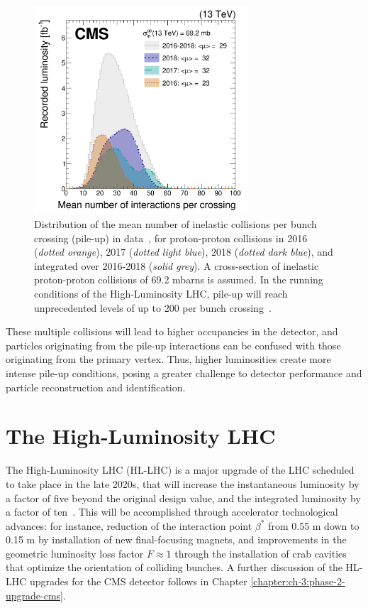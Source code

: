 \begin{figure}[ht]
    \centering
    \includegraphics[width=8cm]{figures/ch-2-cern-cms/pileup-run-2-CMS-JME-18-001_Figure_001.png}
    \caption[Distribution of the mean number of inelastic collisions per bunch crossing (pile-up) in data, for proton-proton collisions in 2016-2018]{Distribution of the mean number of inelastic collisions per bunch crossing (pile-up) in data~\cite{CMS-JME-18-001}, for proton-proton collisions in 2016 (\textit{dotted orange}), 2017 (\textit{dotted light blue}), 2018 (\textit{dotted dark blue}), and integrated over 2016-2018 (\textit{solid grey}). A cross-section of inelastic proton-proton collisions of 69.2 mbarns is assumed. In the running conditions of the High-Luminosity LHC, pile-up will reach unprecedented levels of up to 200 per bunch crossing~\cite{CERN-2020-010-HL-LHC-TDR}.}
    \label{fig:pileup-run-2}
\end{figure}

These multiple collisions will lead to higher occupancies in the detector, and particles originating from the pile-up interactions can be confused with those originating from the primary vertex. Thus, higher luminosities create more intense pile-up conditions, posing a greater challenge to detector performance and particle reconstruction and identification.


\section{The High-Luminosity LHC}
\label{section:HL-LHC}
The High-Luminosity LHC (HL-LHC) is a major upgrade of the LHC scheduled to take place in the late 2020s, that will increase the instantaneous luminosity by a factor of five beyond the original design value, and the integrated luminosity by a factor of ten~\cite{CERN-2020-010-HL-LHC-TDR}. This will be accomplished through accelerator technological advances: for instance, reduction of the interaction point $\beta^*$ from 0.55 m down to 0.15 m by installation of new final-focusing magnets, and improvements in the geometric luminosity loss factor $F \approx 1$ through the installation of crab cavities that optimize the orientation of colliding bunches. A further discussion of the HL-LHC upgrades for the CMS detector follows in Chapter \ref{chapter:ch-3:phase-2-upgrade-cms}.

